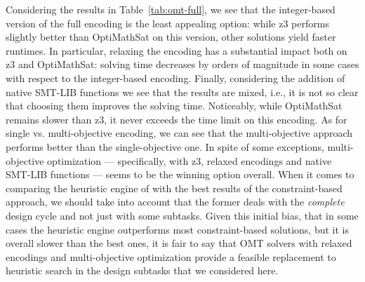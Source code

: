 Considering the results in Table~\ref{tab:omt-full}, we see that
the integer-based version of the full encoding is the least appealing
option: while z3 performs slightly better than OptiMathSat on this
version, other solutions yield faster runtimes. In particular,
relaxing the encoding has a substantial impact both on z3 and
OptiMathSat: solving time decreases by orders of magnitude in some
cases with  respect to the integer-based encoding. Finally,
considering the addition of native SMT-LIB functions we see that the
results are mixed, i.e., it is not so clear that choosing them
improves the solving time. Noticeably, while OptiMathSat remains
slower than z3, it never exceeds the time limit on this encoding.
As for single vs. multi-objective encoding, we can see that the
multi-objective approach performs better than the single-objective
one. In spite of some exceptions, multi-objective optimization ---
specifically, with z3, relaxed encodings and native SMT-LIB functions
--- seems to be the winning option overall.
When it comes to comparing the heuristic engine of \liftcreate{} with
the best results of the constraint-based approach, we should take into
account that the former deals with the \emph{complete} design cycle
and not just with some subtasks. Given this initial bias, that in
some cases the heuristic engine outperforms most constraint-based
solutions, but it is overall slower than the best ones, it is fair to
say that OMT solvers with relaxed encodings and multi-objective
optimization provide a feasible replacement to heuristic search in
the design subtasks that we considered here.



